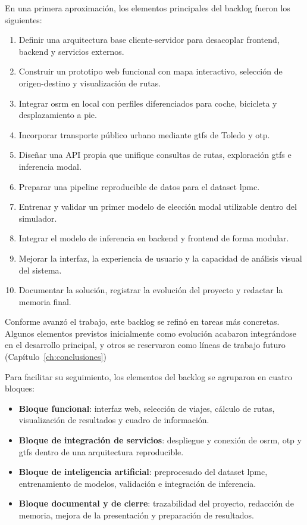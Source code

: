 En una primera aproximación, los elementos principales del backlog fueron los siguientes:

\begin{enumerate}
  \item Definir una arquitectura base cliente-servidor para desacoplar frontend, backend y servicios externos.
  \item Construir un prototipo web funcional con mapa interactivo, selección de origen-destino y visualización de rutas.
  \item Integrar \gls{osrm} en local con perfiles diferenciados para coche, bicicleta y desplazamiento a pie.
  \item Incorporar transporte público urbano mediante \gls{gtfs} de Toledo y \gls{otp}.
  \item Diseñar una API propia que unifique consultas de rutas, exploración \gls{gtfs} e inferencia modal.
  \item Preparar una pipeline reproducible de datos para el dataset \gls{lpmc}.
  \item Entrenar y validar un primer modelo de elección modal utilizable dentro del simulador.
  \item Integrar el modelo de inferencia en backend y frontend de forma modular.
  \item Mejorar la interfaz, la experiencia de usuario y la capacidad de análisis visual del sistema.
  \item Documentar la solución, registrar la evolución del proyecto y redactar la memoria final.
\end{enumerate}

Conforme avanzó el trabajo, este backlog se refinó en tareas más concretas. Algunos elementos previstos inicialmente como evolución acabaron integrándose en el desarrollo principal, y otros se reservaron como líneas de trabajo futuro (Capítulo~\ref{ch:conclusiones})
\newpage

Para facilitar su seguimiento, los elementos del backlog se agruparon en cuatro bloques:
\begin{itemize}
  \item \textbf{Bloque funcional}: interfaz web, selección de viajes, cálculo de rutas, visualización de resultados y cuadro de información.
  \item \textbf{Bloque de integración de servicios}: despliegue y conexión de \gls{osrm}, \gls{otp} y \gls{gtfs} dentro de una arquitectura reproducible.
  \item \textbf{Bloque de inteligencia artificial}: preprocesado del dataset \gls{lpmc}, entrenamiento de modelos, validación e integración de inferencia.
  \item \textbf{Bloque documental y de cierre}: trazabilidad del proyecto, redacción de memoria, mejora de la presentación y preparación de resultados.
\end{itemize}


